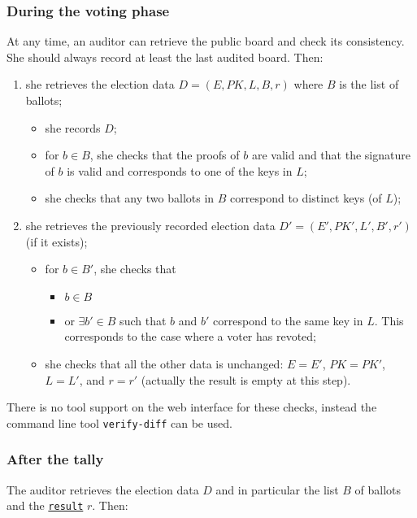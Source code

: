 \documentclass[a4paper]{article}
\newcommand{\result}{\texttt{result}}
\begin{document}
\subsubsection{During the voting phase}
\label{sec:audit-voting}
At any time, an auditor can retrieve the public board and check its consistency. She should
always record at least the last audited board. Then:
\begin{enumerate}
\item she retrieves the election data $D = (E,PK,L,B,r)$ where $B$ is the list of ballots;
  \begin{itemize}
  \item she records $D$;
  \item for $b\in B$, she checks that the proofs of $b$ are valid and that
  the signature of $b$ is valid and corresponds to one of the keys in
  $L$;
  \item she checks that any two ballots in $B$ correspond to distinct keys (of
    $L$);
  \end{itemize}
\item she retrieves the previously recorded election data $D' = (E',PK',L',B',r')$ (if it
  exists);
  \begin{itemize}
  \item for $b\in B'$, she checks that
    \begin{itemize}
    \item $b\in B$
    \item or $\exists b'\in B$ such that $b$ and $b'$ correspond to
      the same key in $L$. This corresponds to the case where a voter
      has revoted;
    \end{itemize}
    \item she checks that all the other data is unchanged: $E=E'$, $PK=PK'$, $L=L'$,
      and $r=r'$ (actually the result is empty at this step).
\end{itemize}
\end{enumerate}

There is no tool support on the web interface for these checks,
instead the command line tool \texttt{verify-diff} can be used.

\subsubsection{After the tally}
The auditor retrieves the election data $D$ and in
  particular the list $B$ of ballots and the
  \hyperref[election-result]{\result} $r$. Then:
\end{document}

